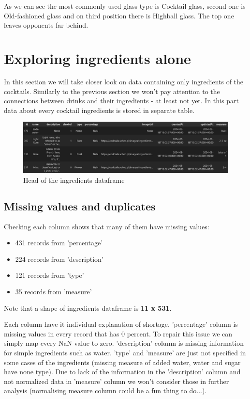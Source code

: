\documentclass[a4paper]{article}
\begin{document}
As we can see the most commonly used glass type is Cocktail glass, second one is Old-fashioned glass and on third position there is Highball glass. The top one leaves opponents far behind.

\section{Exploring ingredients alone}
In this section we will take closer look on data containing only ingredients of the cocktails. Similarly to the previous section we won't pay attention to the connections between drinks and their ingredients - at least not yet. In this part data about every cocktail ingredients is stored in separate table.

\begin{figure}[H]
    \centering
    \includegraphics[width=1\linewidth]{ingrhead.png}
    \caption{Head of the ingredients dataframe}
    \label{fig:enter-label}
\end{figure}

\subsection{Missing values and duplicates}
Checking each column shows that many of them have missing values:
\begin{itemize}
    \item 431 records from 'percentage'
    \item 224 records from 'description'
    \item 121 records from 'type'
    \item 35 records from 'measure'
\end{itemize}
Note that a shape of ingredients dataframe is \textbf{11 x 531}.

Each column have it individual explanation of shortage. 'percentage' column is missing values in every record that has 0 percent. To repair this issue we can simply map every NaN value to zero. 'description' column is missing information for simple ingredients such as water. 'type' and 'measure' are just not specified in some cases of the ingredients (missing measure of added water, water and sugar have none type). Due to lack of the information in the 'description' column and not normalized data in 'measure' column we won't consider those in further analysis (normalising measure column could be a fun thing to do...).
\end{document}
